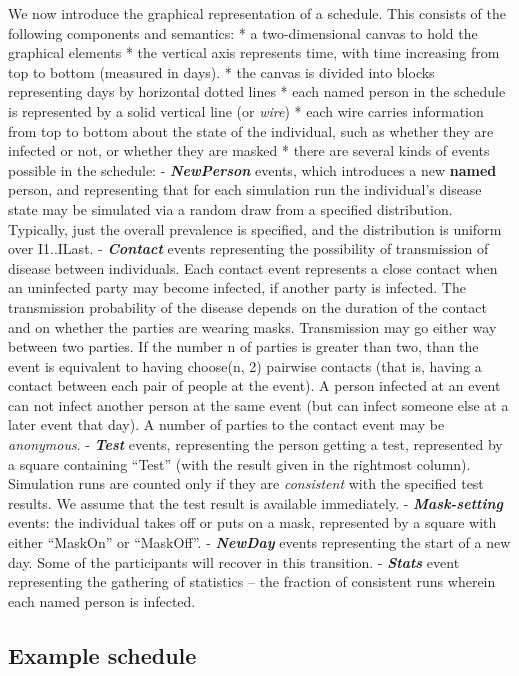 \documentclass[11pt]{article}
\begin{document}
We now introduce the graphical representation of a schedule. This
consists of the following components and semantics: * a two-dimensional
canvas to hold the graphical elements * the vertical axis represents
time, with time increasing from top to bottom (measured in days). * the
canvas is divided into blocks representing days by horizontal dotted
lines * each named person in the schedule is represented by a solid
vertical line (or \emph{wire}) * each wire carries information from top
to bottom about the state of the individual, such as whether they are
infected or not, or whether they are masked * there are several kinds of
events possible in the schedule: - \textbf{\emph{NewPerson}} events,
which introduces a new \textbf{named} person, and representing that for
each simulation run the individual's disease state may be simulated via
a random draw from a specified distribution. Typically, just the overall
prevalence is specified, and the distribution is uniform over I1..ILast.
- \textbf{\emph{Contact}} events representing the possibility of
transmission of disease between individuals. Each contact event
represents a close contact when an uninfected party may become infected,
if another party is infected. The transmission probability of the
disease depends on the duration of the contact and on whether the
parties are wearing masks. Transmission may go either way between two
parties. If the number n of parties is greater than two, than the event
is equivalent to having choose(n, 2) pairwise contacts (that is, having
a contact between each pair of people at the event). A person infected
at an event can not infect another person at the same event (but can
infect someone else at a later event that day). A number of parties to
the contact event may be \emph{anonymous}. - \textbf{\emph{Test}}
events, representing the person getting a test, represented by a square
containing ``Test'' (with the result given in the rightmost column).
Simulation runs are counted only if they are \emph{consistent} with the
specified test results. We assume that the test result is available
immediately. - \textbf{\emph{Mask-setting}} events: the individual takes
off or puts on a mask, represented by a square with either ``MaskOn'' or
``MaskOff''. - \textbf{\emph{NewDay}} events representing the start of a
new day. Some of the participants will recover in this transition. -
\textbf{\emph{Stats}} event representing the gathering of statistics --
the fraction of consistent runs wherein each named person is infected.

    \hypertarget{example-schedule}{%
\subsection{Example schedule}\label{example-schedule}}
\end{document}
